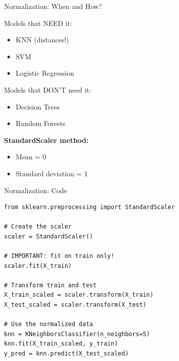 \documentclass[aspectratio=169]{beamer}
\begin{document}
\begin{frame}{Normalization: When and How?}
\begin{block}{Models that NEED it:}
\begin{itemize}
    \item KNN (distances!)
    \item SVM
    \item Logistic Regression
\end{itemize}
\end{block}

\begin{block}{Models that DON'T need it:}
\begin{itemize}
    \item Decision Trees
    \item Random Forests
\end{itemize}
\end{block}

\vspace{0.3cm}
\textbf{StandardScaler method:}
\begin{itemize}
    \item Mean = 0
    \item Standard deviation = 1
\end{itemize}
\end{frame}

\begin{frame}[fragile]{Normalization: Code}
\begin{lstlisting}
from sklearn.preprocessing import StandardScaler

# Create the scaler
scaler = StandardScaler()

# IMPORTANT: fit on train only!
scaler.fit(X_train)

# Transform train and test
X_train_scaled = scaler.transform(X_train)
X_test_scaled = scaler.transform(X_test)

# Use the normalized data
knn = KNeighborsClassifier(n_neighbors=5)
knn.fit(X_train_scaled, y_train)
y_pred = knn.predict(X_test_scaled)
\end{lstlisting}


\end{frame}
\end{document}
